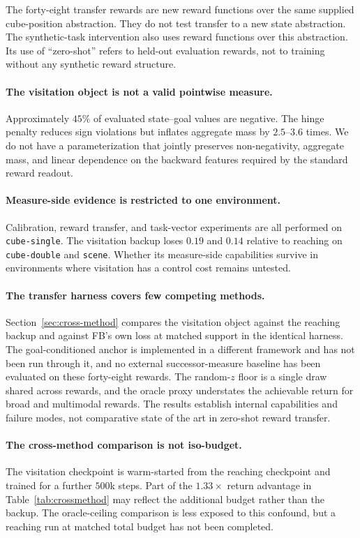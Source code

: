\documentclass{article}
\begin{document}
The forty-eight transfer rewards are new reward functions over the same supplied
cube-position abstraction. They do not test transfer to a new state abstraction.
The synthetic-task intervention also uses reward functions over this abstraction.
Its use of ``zero-shot'' refers to held-out evaluation rewards, not to training
without any synthetic reward structure.

\paragraph{The visitation object is not a valid pointwise measure.}
Approximately $45\%$ of evaluated state--goal values are negative. The hinge
penalty reduces sign violations but inflates aggregate mass by $2.5$--$3.6$ times.
We do not have a parameterization that jointly preserves non-negativity, aggregate
mass, and linear dependence on the backward features required by the standard
reward readout.

\paragraph{Measure-side evidence is restricted to one environment.}
Calibration, reward transfer, and task-vector experiments are all performed on
\texttt{cube-single}. The visitation backup loses $0.19$ and $0.14$ relative to
reaching on \texttt{cube-double} and \texttt{scene}. Whether its measure-side
capabilities survive in environments where visitation has a control cost remains
untested.

\paragraph{The transfer harness covers few competing methods.}
Section~\ref{sec:cross-method} compares the visitation object against the reaching
backup and against FB's own loss at matched support in the identical harness. The
goal-conditioned anchor is implemented in a different framework and has not been
run through it, and no external successor-measure baseline has been evaluated on
these forty-eight rewards. The random-$z$ floor is a single draw shared across
rewards, and the oracle proxy understates the achievable return for broad and
multimodal rewards. The results establish internal capabilities and failure modes,
not comparative state of the art in zero-shot reward transfer.

\paragraph{The cross-method comparison is not iso-budget.}
The visitation checkpoint is warm-started from the reaching checkpoint and trained
for a further $500$k steps. Part of the $1.33\times$ return advantage in
Table~\ref{tab:crossmethod} may reflect the additional budget rather than the
backup. The oracle-ceiling comparison is less exposed to this confound, but a
reaching run at matched total budget has not been completed.
\end{document}
